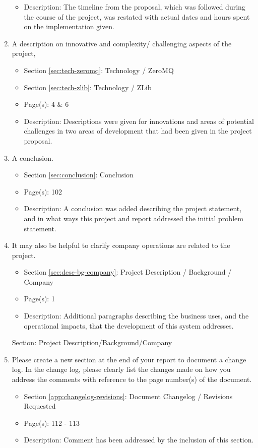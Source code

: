\documentclass[11pt]{article}
\begin{document}
\begin{enumerate}
\begin{itemize}
            \item Description: The timeline from the proposal, which was
              followed during the course of the project, was restated with
              actual dates and hours spent on the implementation given.
          \end{itemize}
        \item A description on innovative and complexity/ challenging aspects
          of the project,
          \begin{itemize}
            \item Section \ref{sec:tech-zeromq}: Technology / ZeroMQ
            \item Section \ref{sec:tech-zlib}: Technology / ZLib
            \item Page(s): 4 \& 6
            \item Description: Descriptions were given for innovations and
              areas of potential challenges in two areas of development that
              had been given in the project proposal.
          \end{itemize}
        \item A conclusion.
          \begin{itemize}
            \item Section \ref{sec:conclusion}: Conclusion
            \item Page(s): 102
            \item Description: A conclusion was added describing the project
              statement, and in what ways this project and report addressed the
              initial problem statement.
          \end{itemize}
        \item It may also be helpful to clarify company operations are related to the
          project.
          \begin{itemize}
            \item Section \ref{sec:desc-bg-company}: Project Description / Background / Company
            \item Page(s): 1
            \item Description: Additional paragraphs describing the business
              uses, and the operational impacts, that the development of this
              system addresses.
          \end{itemize}
          Section: Project Description/Background/Company
        \item Please create a new section at the end of your report to document
          a change log. In the change log, please clearly list the changes made
          on how you address the comments with reference to the page number(s)
          of the document.
          \begin{itemize}
            \item Section \ref{app:changelog-revisions}: Document Changelog / Revisions Requested
            \item Page(s): 112 - 113
            \item Description: Comment has been addressed by the inclusion of
              this section.
          \end{itemize}
      \end{enumerate}
\end{document}
